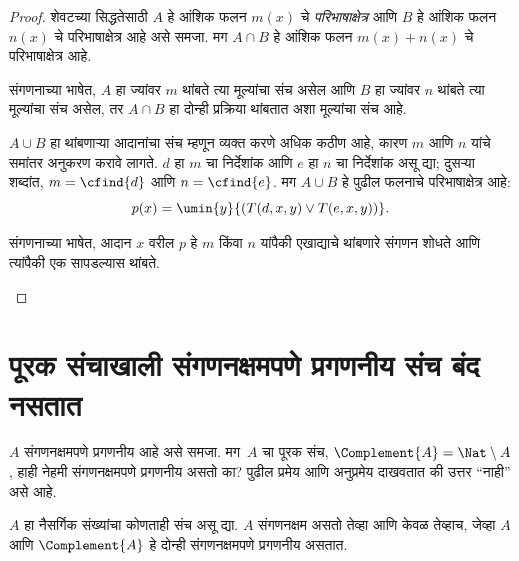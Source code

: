 \begin{proof}
शेवटच्या सिद्धतेसाठी $A$ हे आंशिक फलन $m(x)$ चे
\emph{परिभाषाक्षेत्र} आणि $B$ हे आंशिक फलन $n(x)$ चे
परिभाषाक्षेत्र आहे असे समजा. मग $A \cap B$ हे आंशिक फलन
$m(x) +
n(x)$ चे परिभाषाक्षेत्र आहे.

\begin{explain}
संगणनाच्या भाषेत, $A$ हा ज्यांवर $m$ थांबते त्या
मूल्यांचा संच असेल आणि $B$ हा ज्यांवर $n$ थांबते त्या
मूल्यांचा संच असेल, तर $A \cap B$ हा दोन्ही प्रक्रिया
थांबतात अशा मूल्यांचा संच आहे.
\end{explain}

$A \cup B$ हा थांबणाऱ्या आदानांचा संच म्हणून व्यक्त करणे
अधिक कठीण आहे, कारण $m$ आणि $n$ यांचे समांतर अनुकरण
करावे लागते. $d$ हा $m$ चा निर्देशांक आणि $e$ हा $n$
चा निर्देशांक असू द्या; दुसऱ्या शब्दांत, $m =
\cfind{d}$ आणि $n = \cfind{e}$. मग $A \cup B$ हे
पुढील फलनाचे परिभाषाक्षेत्र आहे:
\[p(x) = \umin{y}{(T(d,x,y) \lor T(e,x,y))}.
\]
\begin{explain}
संगणनाच्या भाषेत, आदान $x$ वरील $p$ हे $m$ किंवा
$n$ यांपैकी एखाद्याचे थांबणारे संगणन शोधते आणि त्यांपैकी
एक सापडल्यास थांबते.
\end{explain}
\end{proof}











\section{पूरक संचाखाली संगणनक्षमपणे प्रगणनीय संच बंद नसतात}\label{cmp:thy:cmp:sec}

$A$ संगणनक्षमपणे प्रगणनीय आहे असे समजा. मग~$A$ चा पूरक संच,
$\Complement{A} = \Nat \setminus A$, हाही नेहमी संगणनक्षमपणे
प्रगणनीय असतो का? पुढील प्रमेय आणि अनुप्रमेय दाखवतात की उत्तर
``नाही'' असे आहे.

\begin{thm}
\label{cmp:thy:cmp:thm:ce-comp}
$A$ हा नैसर्गिक संख्यांचा कोणताही संच असू द्या. $A$ संगणनक्षम असतो
तेव्हा आणि केवळ तेव्हाच, जेव्हा $A$ आणि $\Complement{A}$ हे दोन्ही
संगणनक्षमपणे प्रगणनीय असतात.
\end{thm}

